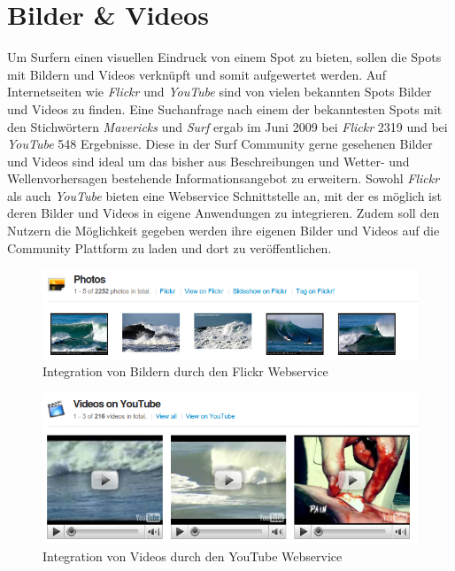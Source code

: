 \section{Bilder \& Videos}

Um Surfern einen visuellen Eindruck von einem Spot zu bieten, sollen
die Spots mit Bildern und Videos verknüpft und somit aufgewertet
werden. Auf Internetseiten wie \textit{Flickr} und \textit{YouTube}
sind von vielen bekannten Spots Bilder und Videos zu finden. Eine
Suchanfrage nach einem der bekanntesten Spots mit den Stichwörtern
\textit{Mavericks} und \textit{Surf} ergab im Juni 2009 bei
\textit{Flickr} 2319 und bei \textit{YouTube} 548 Ergebnisse. Diese in
der Surf Community gerne gesehenen Bilder und Videos sind ideal um das
bisher aus Beschreibungen und Wetter- und Wellenvorhersagen bestehende
Informationsangebot zu erweitern. Sowohl \textit{Flickr} als auch
\textit{YouTube} bieten eine Webservice Schnittstelle an, mit der es
möglich ist deren Bilder und Videos in eigene Anwendungen zu
integrieren. Zudem soll den Nutzern die Möglichkeit gegeben werden
ihre eigenen Bilder und Videos auf die Community Plattform zu laden
und dort zu veröffentlichen.

\begin{figure}[h]
  \begin{center}
    \includegraphics[width=\textwidth]{bilder/photos-flickr}
    \caption{Integration von Bildern durch den Flickr Webservice}
    \label{piktogramm}
  \end{center}
\end{figure}

\begin{figure}[h]
  \begin{center}
    \includegraphics[width=\textwidth]{bilder/videos-youtube}
    \caption{Integration von Videos durch den YouTube Webservice}
    \label{piktogramm}
  \end{center}
\end{figure}

